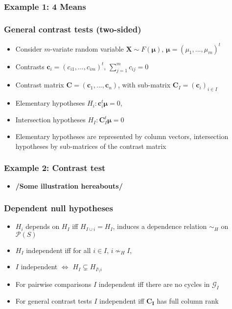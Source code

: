 \documentclass[bigger]{beamer}
\newcommand{\bs}[1]{\bm{#1}}
\begin{document}
\begin{frame}
\frametitle{Example 1: 4 Means}

\end{frame}



\begin{frame}
\frametitle{General contrast tests (two-sided)}
\begin{itemize}

\item Consider $m$-variate random variable $\bs{X} \sim F(\bs{\mu})$, $\bs{\mu} = (\mu_1,...,\mu_m)^t$

\item Contrasts $\bs{c}_i = (c_{i1},...,c_{im})^t$, $\sum_{j = 1}^m
  c_{ij} = 0$
\item Contrast matrix  $\bs{C} = \left( \bs{c}_1,...,\bs{c}_n\right)$,
  with sub-matrix $\bs{C}_I = \left( \bs{c}_i \right)_{i \in
    I}$
\item Elementary hypotheses $H_i: \bs{c}_i^t\bs{\mu} = 0$,
\item Intersection hypotheses $H_I: \bs{C}_I^t\bs{\mu} = 0$

\item Elementary hypotheses are represented by column vectors,
  intersection hypotheses by sub-matrices of the contrast matrix

\end{itemize} %
\end{frame}



\begin{frame}
\frametitle{Example 2: Contrast test}
\begin{itemize}

\item \textbf{/Some illustration hereabouts/}

\end{itemize} %
\end{frame}



\begin{frame}
\frametitle{Dependent null hypotheses}

\begin{itemize}
\item $H_i$ depends on $H_I$ iff $H_{I \cup i} = H_{I}$, induces a
  dependence relation $\sim_H$ on $\mathcal{P}(S)$
\item $H_I$ independent iff for all $i \in I$, $i \nsim_H I$,
\item $I$ independent $\Leftrightarrow$ $H_{I} \subsetneq  H_{I\setminus i}$
\item For pairwise comparisons $I$ independent iff there are no cycles in $\mathscr{G}_I$
\item For general contrast tests $I$ independent iff $\bs{C_I}$ has full
  column rank
\end{itemize} %
\end{frame}
\end{document}
